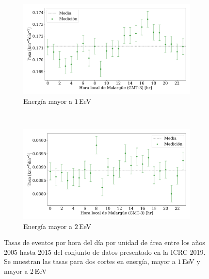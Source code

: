    \begin{figure}[H]
       \centering
       \begin{subfigure}[b]{0.9\textwidth}
       \includegraphics[width=\textwidth]{Graphs/rate_hour_of_the_day/herald_above_1EeV_hour_of_the_day.pdf}
       \caption{Energía mayor a $1\,$EeV}
       \label{fig:rate_day_ICRC_19_05_18_2EeV}
       \end{subfigure}\\
       \centering
       \begin{subfigure}[b]{0.9\textwidth}
       \includegraphics[width=\textwidth]{Graphs/rate_hour_of_the_day/herald_above_2EeV_hour_of_the_day.pdf}
       \caption{Energía mayor a $2\,$EeV}
       \label{fig:rate_2015_ICRC_19_05_18_2EeV}
       \end{subfigure}%
       \caption{Tasas de eventos  por hora del día por unidad de área entre los años 2005 hasta 2015 del conjunto de datos presentado en la ICRC 2019.  Se muestran las tasas para dos cortes en energía, mayor a $1\,$EeV y mayor a $2\,$EeV}\label{fig:rate_new_18_2EeV}
   \end{figure}



